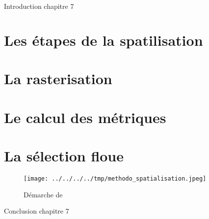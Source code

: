 \chaptertoc{}


Introduction chapitre 7

\section{Les étapes de la spatilisation}
\section{La rasterisation}
\section{Le calcul des métriques}
\section{La sélection floue}


\begin{figure}
  \centering
  \texttt{[image: ../../../../tmp/methodo\_spatialisation.jpeg]}
  \caption{Démarche de }
  \label{fig:methodo_spatialisation}
\end{figure}



Conclusion chapitre 7
